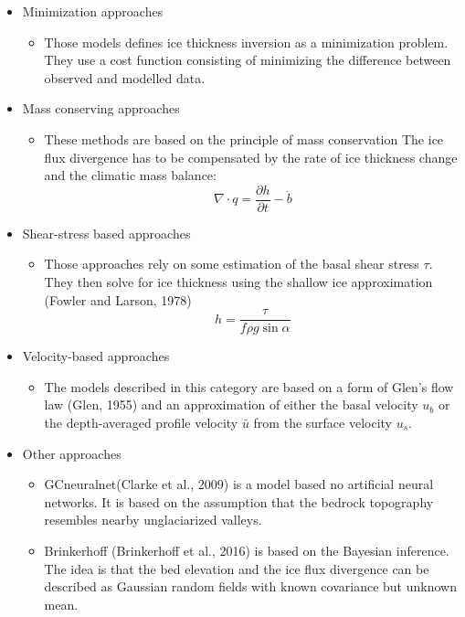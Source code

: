 \documentclass[a4, 12pt]{article}
\begin{document}
\begin{itemize}
	\item Minimization approaches
		\begin{itemize}
			\item Those models defines ice thickness inversion as a minimization problem. They use a cost 					function consisting of minimizing the difference between observed and modelled data. 	
		\end{itemize}
	\item Mass conserving approaches
		\begin{itemize}
			\item These methods are based on the principle of mass conservation \cite{farinotti2016accurate} The 						ice flux divergence has to be compensated by the rate of ice thickness change and the 						climatic mass balance:
				\[\nabla \cdot q = \frac{\partial h}{\partial t} - \dot{b}\]
		\end{itemize}
	\item Shear-stress based approaches
		\begin{itemize}
			\item Those approaches rely on some estimation of the basal shear stress $\tau$. They then 					solve for ice thickness using the shallow ice approximation (Fowler and Larson, 1978)
			\[h = \frac{\tau}{f\rho g \sin{\alpha}}\]
		\end{itemize}
	\item Velocity-based approaches
		\begin{itemize}
			\item The models described in this category are based on a form of Glen's flow law (Glen, 					1955) and an approximation of either the basal velocity $u_b$ or the depth-averaged profile 				velocity $\bar{u}$ from the surface velocity $u_s$.
		\end{itemize} 
	\item Other approaches
		\begin{itemize}
			\item GCneuralnet(Clarke et al., 2009) is a model based no artificial neural networks. It is based on the assumption that the bedrock topography resembles nearby unglaciarized valleys.
			\item Brinkerhoff (Brinkerhoff et al., 2016) is based on the Bayesian inference. The idea is that the bed elevation and the ice flux divergence can be described as Gaussian random fields with known covariance but unknown mean.
		\end{itemize}		
\end{itemize}
\end{document}
